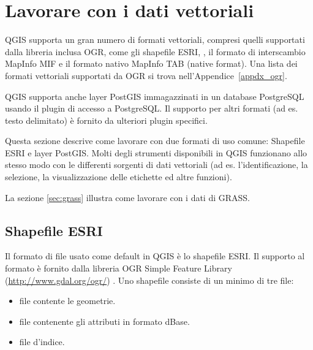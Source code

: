 
\section{Lavorare con i dati vettoriali}\label{label_workingvector}



QGIS supporta un gran numero di formati vettoriali, compresi quelli supportati
dalla libreria inclusa OGR, come gli shapefile ESRI,
, il formato di
interscambio MapInfo MIF
e il formato nativo MapInfo TAB (native format).
Una lista dei formati vettoriali supportati da OGR si trova nell'Appendice~\ref{appdx_ogr}.

QGIS supporta anche layer PostGIS
immagazzinati in un database PostgreSQL usando il plugin di accesso a PostgreSQL.
Il supporto per altri formati (ad es. testo delimitato) è fornito da
ulteriori plugin specifici.

Questa sezione descrive come lavorare con due formati di uso comune:
Shapefile ESRI e layer PostGIS. Molti degli strumenti disponibili in QGIS
funzionano allo stesso modo con le differenti sorgenti di dati vettoriali (ad
es. l'identificazione, la selezione, la visualizzazione delle etichette ed
altre funzioni).

La sezione \ref{sec:grass} illustra come lavorare con i dati di GRASS.

\subsection{Shapefile ESRI}

Il formato di file usato come default in QGIS è lo shapefile ESRI. Il supporto al formato è fornito dalla libreria OGR Simple Feature Library (\url{http://www.gdal.org/ogr/})
. Uno shapefile consiste di un minimo di tre file:

\begin{itemize}
\item {} file contente le geometrie.
\item {} file contenente gli attributi in formato dBase.
\item {} file d'indice.
\end{itemize}

